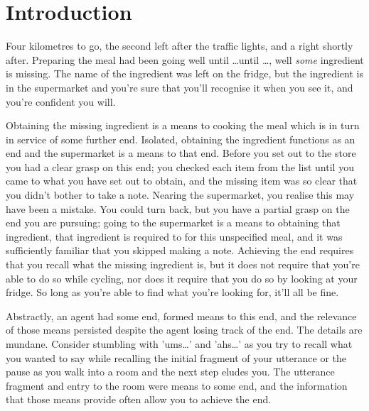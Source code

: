 \documentclass[10pt]{article}
\begin{document}
\newpage
\maketitle

\section{Introduction}
\label{sec:introduction}

Four kilometres to go, the second left after the traffic lights, and a right shortly after.
Preparing the meal had been going well until \dots until \dots, well \emph{some} ingredient is missing.
The name of the ingredient was left on the fridge, but the ingredient is in the supermarket and you're sure that you'll recognise it when you see it, and you're confident you will.

Obtaining the missing ingredient is a means to cooking the meal which is in turn in service of some further end.
Isolated, obtaining the ingredient functions as an end and the supermarket is a means to that end.
Before you set out to the store you had a clear grasp on this end; you checked each item from the list until you came to what you have set out to obtain, and the missing item was so clear that you didn't bother to take a note.
Nearing the supermarket, you realise this may have been a mistake.
You could turn back, but you have a partial grasp on the end you are pursuing; going to the supermarket is a means to obtaining that ingredient, that ingredient is required to for this unspecified meal, and it was sufficiently familiar that you skipped making a note.
Achieving the end requires that you recall what the missing ingredient is, but it does not require that you're able to do so while cycling, nor does it require that you do so by looking at your fridge.
So long as you're able to find what you're looking for, it'll all be fine.

Abstractly, an agent had some end, formed means to this end, and the relevance of those means persisted despite the agent losing track of the end.
The details are mundane.
Consider stumbling with 'ums\dots' and 'ahs\dots' as you try to recall what you wanted to say while recalling the initial fragment of your utterance or the pause as you walk into a room and the next step eludes you.
The utterance fragment and entry to the room were means to some end, and the information that those means provide often allow you to achieve the end.
\end{document}
